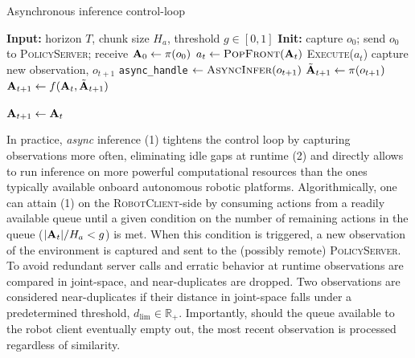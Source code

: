 \begin{algorithm}
  \caption{Asynchronous inference control-loop}
  \label{alg:async-inference}
  \begin{algorithmic}[1]
    \State \textbf{Input:} horizon \( T \), chunk size \( H_a \), threshold \( g\in[0,1] \)
    \State \textbf{Init:} capture \( o_0 \); send \( o_0 \) to \textsc{PolicyServer};
           receive \( \mathbf{A}_0 \gets \pi(o_0) \)
        \State \( a_t \gets \textsc{PopFront}(\mathbf{A}_t) \)
        \State \textsc{Execute}(\( a_t \)) 
         
            \State capture new observation, \( o_{t+1} \)
             
                \State \texttt{async\_handle} \( \gets \textsc{AsyncInfer}(o_{t+1})\) 
                \State \( \tilde{\mathbf{A}}_{t+1} \gets \pi(o_{t+1}) \) 
                \State \( \mathbf{A}_{t+1} \gets f(\mathbf{A}_t,\tilde{\mathbf{A}}_{t+1}) \) 
                
            \EndIf
        \EndIf
            \State \( \mathbf{A}_{t+1} \gets \mathbf{A}_t \) 
        \EndIf
    \EndFor
  \end{algorithmic}
\end{algorithm}

In practice, \emph{async} inference (1) tightens the control loop by capturing observations more often, eliminating idle gaps at runtime (2) and directly allows to run inference on more powerful computational resources than the ones typically available onboard autonomous robotic platforms.
Algorithmically, one can attain (1) on the \textsc{RobotClient}-side by consuming actions from a readily available queue until a given condition on the number of remaining actions in the queue (\(\vert \mathbf{A}_t \vert / H_a < g \)) is met. When this condition is triggered, a new observation of the environment is captured and sent to the (possibly remote) \textsc{PolicyServer}. 
To avoid redundant server calls and erratic behavior at runtime observations are compared in joint-space, and near-duplicates are dropped.
Two observations are considered near-duplicates if their distance in joint-space falls under a predetermined threshold, \( d_{\text{lim}} \in \mathbb R_+\).
Importantly, should the queue available to the robot client eventually empty out, the most recent observation is processed regardless of similarity.

